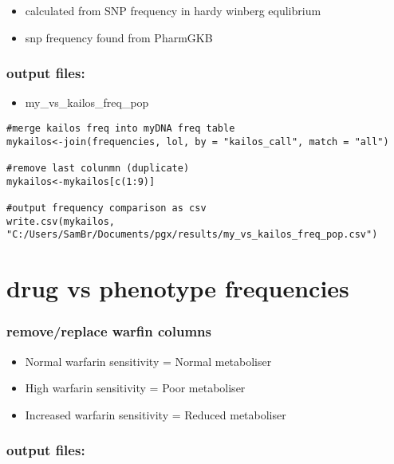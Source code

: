 \documentclass[]{article}
\providecommand{\tightlist}{%
  \setlength{\itemsep}{0pt}\setlength{\parskip}{0pt}}
\begin{document}
\begin{itemize}
\tightlist
\item
  calculated from SNP frequency in hardy winberg equlibrium
\item
  snp frequency found from PharmGKB
\end{itemize}

\subsubsection{output files:}\label{output-files-4}

\begin{itemize}
\tightlist
\item
  my\_vs\_kailos\_freq\_pop
\end{itemize}

\begin{verbatim}
#merge kailos freq into myDNA freq table
mykailos<-join(frequencies, lol, by = "kailos_call", match = "all")

#remove last colunmn (duplicate)
mykailos<-mykailos[c(1:9)]

#output frequency comparison as csv 
write.csv(mykailos, "C:/Users/SamBr/Documents/pgx/results/my_vs_kailos_freq_pop.csv")
\end{verbatim}

\section{drug vs phenotype
frequencies}\label{drug-vs-phenotype-frequencies}

\subsubsection{remove/replace warfin
columns}\label{removereplace-warfin-columns}

\begin{itemize}
\tightlist
\item
  Normal warfarin sensitivity = Normal metaboliser
\item
  High warfarin sensitivity = Poor metaboliser
\item
  Increased warfarin sensitivity = Reduced metaboliser
\end{itemize}

\subsubsection{output files:}\label{output-files-5}
\end{document}
